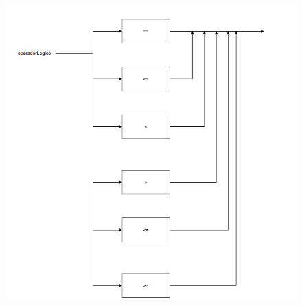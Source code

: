 \documentclass[11pt]{article}
\begin{document}
\newpage

\begin{figure}[H]
    \includegraphics[scale=2.5]{grafos_sintaticos/operador_logico.png}

   
\end{figure}


\newpage
\end{document}
